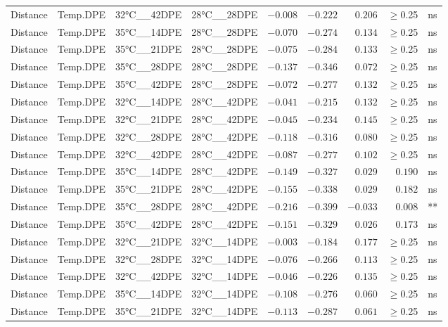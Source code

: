 \documentclass[
]{article}
\begin{document}
\begin{longtable}{llllrrrrl}
Distance & Temp.DPE & 32°C\_\_42DPE & 28°C\_\_28DPE & $-0.008$ & $-0.222$ & $0.206$ & $\geq$0.25 & ns \\ 
Distance & Temp.DPE & 35°C\_\_14DPE & 28°C\_\_28DPE & $-0.070$ & $-0.274$ & $0.134$ & $\geq$0.25 & ns \\ 
Distance & Temp.DPE & 35°C\_\_21DPE & 28°C\_\_28DPE & $-0.075$ & $-0.284$ & $0.133$ & $\geq$0.25 & ns \\ 
Distance & Temp.DPE & 35°C\_\_28DPE & 28°C\_\_28DPE & $-0.137$ & $-0.346$ & $0.072$ & $\geq$0.25 & ns \\ 
Distance & Temp.DPE & 35°C\_\_42DPE & 28°C\_\_28DPE & $-0.072$ & $-0.277$ & $0.132$ & $\geq$0.25 & ns \\ 
Distance & Temp.DPE & 32°C\_\_14DPE & 28°C\_\_42DPE & $-0.041$ & $-0.215$ & $0.132$ & $\geq$0.25 & ns \\ 
Distance & Temp.DPE & 32°C\_\_21DPE & 28°C\_\_42DPE & $-0.045$ & $-0.234$ & $0.145$ & $\geq$0.25 & ns \\ 
Distance & Temp.DPE & 32°C\_\_28DPE & 28°C\_\_42DPE & $-0.118$ & $-0.316$ & $0.080$ & $\geq$0.25 & ns \\ 
Distance & Temp.DPE & 32°C\_\_42DPE & 28°C\_\_42DPE & $-0.087$ & $-0.277$ & $0.102$ & $\geq$0.25 & ns \\ 
Distance & Temp.DPE & 35°C\_\_14DPE & 28°C\_\_42DPE & $-0.149$ & $-0.327$ & $0.029$ & $0.190$ & ns \\ 
Distance & Temp.DPE & 35°C\_\_21DPE & 28°C\_\_42DPE & $-0.155$ & $-0.338$ & $0.029$ & $0.182$ & ns \\ 
Distance & Temp.DPE & 35°C\_\_28DPE & 28°C\_\_42DPE & $-0.216$ & $-0.399$ & $-0.033$ & $0.008$ & ** \\ 
Distance & Temp.DPE & 35°C\_\_42DPE & 28°C\_\_42DPE & $-0.151$ & $-0.329$ & $0.026$ & $0.173$ & ns \\ 
Distance & Temp.DPE & 32°C\_\_21DPE & 32°C\_\_14DPE & $-0.003$ & $-0.184$ & $0.177$ & $\geq$0.25 & ns \\ 
Distance & Temp.DPE & 32°C\_\_28DPE & 32°C\_\_14DPE & $-0.076$ & $-0.266$ & $0.113$ & $\geq$0.25 & ns \\ 
Distance & Temp.DPE & 32°C\_\_42DPE & 32°C\_\_14DPE & $-0.046$ & $-0.226$ & $0.135$ & $\geq$0.25 & ns \\ 
Distance & Temp.DPE & 35°C\_\_14DPE & 32°C\_\_14DPE & $-0.108$ & $-0.276$ & $0.060$ & $\geq$0.25 & ns \\ 
Distance & Temp.DPE & 35°C\_\_21DPE & 32°C\_\_14DPE & $-0.113$ & $-0.287$ & $0.061$ & $\geq$0.25 & ns \\ 

\end{longtable}
\end{document}
